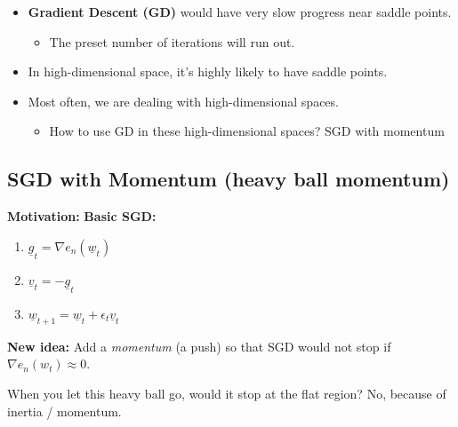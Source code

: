     \begin{intuition}
        \begin{itemize}
            \item \textbf{Gradient Descent (GD)} would have very slow progress near saddle points.
            \begin{itemize}
                \item The preset number of iterations will run out.
            \end{itemize}
            
            \item In high-dimensional space, it's highly likely to have saddle points.
            
            \item Most often, we are dealing with high-dimensional spaces.
            \begin{itemize}
                \item How to use GD in these high-dimensional spaces? SGD with momentum
            \end{itemize}
        \end{itemize}
    \end{intuition}

\subsection{SGD with Momentum (heavy ball momentum)}
    
    \begin{intuition} \textbf{Motivation:}
        \textbf{Basic SGD:} 
        \begin{enumerate}
            \item $\underline{g}_t = \nabla e_n(\underline{w}_t)$
            \item $\underline{v}_t = -\underline{g}_t$
            \item $\underline{w}_{t+1} = \underline{w}_t + \epsilon_t \underline{v}_t$
        \end{enumerate}

        \textbf{New idea:} Add a \textit{momentum} (a push) so that SGD would not stop if \( \nabla e_n(w_t) \approx 0 \).

        When you let this heavy ball go, would it stop at the flat region? No, because of inertia / momentum.

    \end{intuition}

